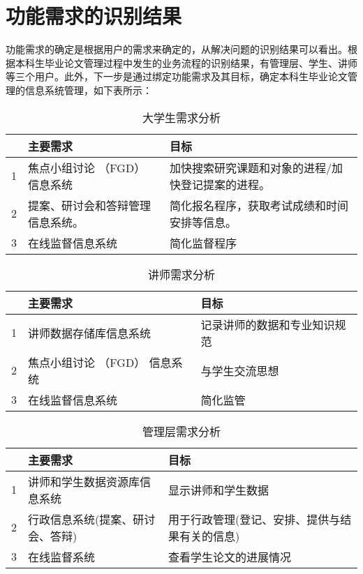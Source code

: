 \section{功能需求的识别结果}

功能需求的确定是根据用户的需求来确定的，从解决问题的识别结果可以看出。根据本科生毕业论文管理过程中发生的业务流程的识别结果，有管理层、学生、讲师等三个用户。此外，下一步是通过绑定功能需求及其目标，确定本科生毕业论文管理的信息系统管理，如下表所示：

\begin{table}[htbp]
      \centering
      \song\wuhao
      \caption{大学生需求分析}
      \label{大学生需求分析}
      \begin{tabular}{lp{5cm}p{8cm}}
            \hline
              & 主要需求                         & 目标                                              \\ \hline
            1 & 焦点小组讨论 （FGD）   信息系统  & 加快搜索研究课题和对象的进程/加快登记提案的进程。 \\
            2 & 提案、研讨会和答辩管理信息系统。 & 简化报名程序，获取考试成绩和时间安排等信息。      \\
            3 & 在线监督信息系统                 & 简化监督程序                                      \\ \hline
      \end{tabular}
\end{table}

\begin{table}[htbp]
      \centering
      \song\wuhao
      \caption{讲师需求分析}
      \label{讲师需求分析}
      \begin{tabular}{lll}
            \hline
              & 主要需求                      & 目标                         \\ \hline
            1 & 讲师数据存储库信息系统        & 记录讲师的数据和专业知识规范 \\
            2 & 焦点小组讨论 （FGD） 信息系统 & 与学生交流思想               \\
            3 & 在线监督信息系统              & 简化监管                     \\ \hline
      \end{tabular}
\end{table}

\begin{table}[htbp]
      \centering
      \song\wuhao
      \caption{管理层需求分析}
      \label{管理层需求分析}
      \begin{tabular}{lll}
            \hline
              & 主要需求                         & 目标                                           \\ \hline
            1 & 讲师和学生数据资源库信息系统     & 显示讲师和学生数据                             \\
            2 & 行政信息系统(提案、研讨会、答辩) & 用于行政管理(登记、安排、提供与结果有关的信息) \\
            3 & 在线监督系统                     & 查看学生论文的进展情况                         \\ \hline
      \end{tabular}
\end{table}

